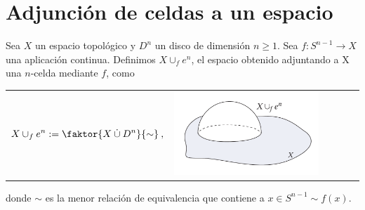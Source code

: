 \section{Adjunción de celdas a un espacio}\label{c1:unionceldas}
Sea $X$ un espacio topológico y $D^n$ un disco de dimensión $n \geq 1$. 
 Sea $f : S^{n-1} \longrightarrow X$ una aplicación continua. Definimos $X \cup_f e^n$, el espacio obtenido adjuntando a X una $n$-celda mediante $f$, como \par
\begin{tabular}{ll}
\begin{minipage}{0.5\textwidth}
\[ X \cup_f e^n := \faktor{ X \: \dot{\cup} \: D^n}{ \sim} \: , \]
\end{minipage}
&
\begin{minipage}{0.5\textwidth}
\includegraphics[width=0.8\textwidth]{images/uceldas.pdf}
\end{minipage}
\end{tabular}
donde $\sim$ es la menor relación de equivalencia que contiene a $x \in S^{n-1} \sim f(x)$.

